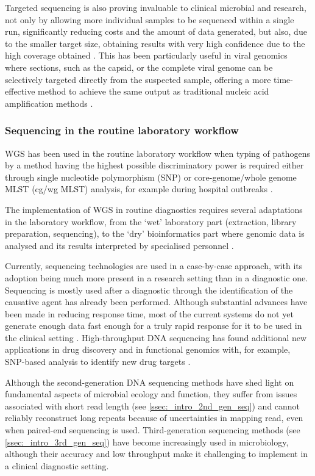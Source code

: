 Targeted sequencing is also proving invaluable to clinical microbial and research, not only by allowing more individual samples to be sequenced within a single run, significantly reducing costs and the amount of data generated, but also, due to the smaller target size, obtaining results with very high confidence due to the high coverage obtained \citep{goodwin_coming_2016}.
This has been particularly useful in viral genomics where sections, such as the capsid, or the complete viral genome can be selectively targeted directly from the suspected sample, offering a more time-effective method to achieve the same output as traditional nucleic acid amplification methods \citep{cassedy_virus_2021}. 

\subsubsection{Sequencing in the routine laboratory workflow} \label{sssec:_intro_sequencing_routine_lab}

WGS has been used in the routine laboratory workflow when typing of pathogens by a method having the highest possible discriminatory power is required either through single nucleotide polymorphism (SNP) or core-genome/whole genome MLST (cg/wg MLST) analysis, for example during hospital outbreaks \citep{tagini_bacterial_2017}. 

The implementation of WGS in routine diagnostics requires several adaptations in the laboratory workflow, from the ‘wet’ laboratory part (extraction, library preparation, sequencing), to the ‘dry’ bioinformatics part where genomic data is analysed and its results interpreted by specialised personnel \citep{rossen_practical_2018}. 

Currently, sequencing technologies are used in a case-by-case approach, with its adoption being much more present in a research setting than in a diagnostic one. 
Sequencing is mostly used after a diagnostic through the identification of the causative agent has already been performed. 
Although substantial advances have been made in reducing response time, most of the current systems do not yet generate enough data fast enough for a truly rapid response for it to be used in the clinical setting \citep{goodwin_coming_2016}. 
High-throughput DNA sequencing has found additional new applications in drug discovery and in functional genomics with, for example, SNP-based analysis to identify new drug targets \citep{loman_twenty_2015}.

Although the second-generation DNA sequencing methods have shed light on fundamental aspects of microbial ecology and function, they suffer from issues associated with short read length (see \ref{ssec:_intro_2nd_gen_seq}) and cannot reliably reconstruct long repeats because of uncertainties in mapping read, even when paired-end sequencing is used. 
Third-generation sequencing methods (see \ref{ssec:_intro_3rd_gen_seq}) have become increasingly used in microbiology, although their accuracy and low throughput make it challenging to implement in a clinical diagnostic setting. 

